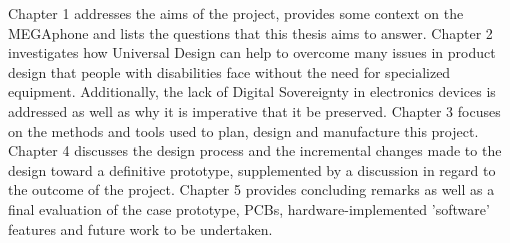 Chapter 1 addresses the aims of the project, provides some context on the MEGAphone and lists the questions that this thesis aims to answer.
Chapter 2 investigates how Universal Design can help to overcome many issues in product design that people with disabilities face without the need for specialized equipment. 
Additionally, the lack of Digital Sovereignty in electronics devices is addressed as well as why it is imperative that it be preserved.
Chapter 3 focuses on the methods and tools used to plan, design and manufacture this project.
Chapter 4 discusses the design process and the incremental changes made to the design toward a definitive prototype, supplemented by a discussion in regard to the outcome of the project. 
Chapter 5 provides concluding remarks as well as a final evaluation of the case prototype, PCBs, hardware-implemented 'software' features and future work to be undertaken.
